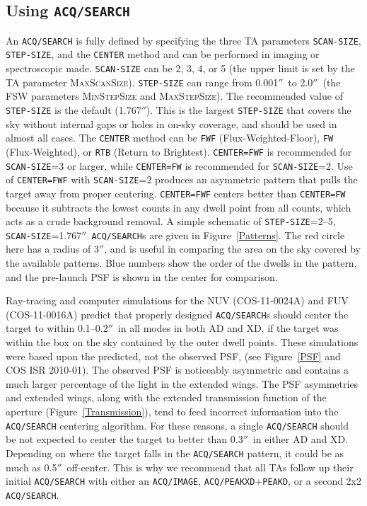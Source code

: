 \documentclass[12pt]{article}
\newcommand{\arcsec}{\ensuremath{''}}
\begin{document}
\subsection{Using \texttt{ACQ/SEARCH}}\label{sec:SEARCH}
An \texttt{ACQ/SEARCH} is fully defined by specifying the three TA parameters
\texttt{SCAN-SIZE}, \texttt{STEP-SIZE}, and the \texttt{CENTER} method and
can be performed in imaging or spectroscopic made.
\texttt{SCAN-SIZE} can be 2, 3, 4, or 5 (the upper limit is set by the
TA parameter \textsc{MaxScanSize}). \texttt{STEP-SIZE} can range from 0.001\arcsec\ to 2.0\arcsec\
(the FSW parameters \textsc{MinStepSize} and \textsc{MaxStepSize}).
The recommended value of \texttt{STEP-SIZE} is the default (1.767\arcsec).
This is the largest \texttt{STEP-SIZE} that covers the sky without internal gaps or holes in on-sky coverage,
and should be used in almost all cases. The \texttt{CENTER} method can be \texttt{FWF} (Flux-Weighted-Floor),
\texttt{FW} (Flux-Weighted), or \texttt{RTB} (Return to Brightest). \texttt{CENTER=FWF} is recommended for
\texttt{SCAN-SIZE}=3 or larger, while \texttt{CENTER=FW} is recommended for \texttt{SCAN-SIZE}=2.
Use of \texttt{CENTER=FWF} with \texttt{SCAN-SIZE}=2 produces an asymmetric pattern that pulls the
target away from proper centering.
\texttt{CENTER=FWF} centers better than \texttt{CENTER=FW} because it subtracts the lowest counts in any
dwell point from all counts, which acts as a crude background removal. A simple schematic of \texttt{STEP-SIZE}=2--5,
\texttt{SCAN-SIZE}=1.767\arcsec\ \texttt{ACQ/SEARCH}s are given in Figure~\ref{Patterns}. The {\color{red}red} circle here has a
radius of 3\arcsec, and is useful in comparing the area on the sky covered by the available patterns.
{\color{blue}Blue} numbers show the order of the dwells in the pattern, and the pre-launch PSF is shown in the center for comparison.

Ray-tracing and computer simulations for the NUV (COS-11-0024A) and
FUV (COS-11-0016A) predict that properly designed \texttt{ACQ/SEARCH}s should
center the target to within 0.1--0.2\arcsec\ in all modes in both AD and XD,
if the target was within the box on the sky contained by the outer dwell points.
These simulations were based upon the predicted, not the observed PSF, (see Figure~\ref{PSF} and COS ISR 2010-01).
The observed PSF is noticeably asymmetric and contains a much larger percentage
of the light in the extended wings. The PSF asymmetries
and extended wings, along with the extended transmission function of the aperture
(Figure~\ref{Transmission}), tend to feed incorrect information into the \texttt{ACQ/SEARCH} centering
algorithm.
For these reasons, a single \texttt{ACQ/SEARCH} should be not expected to center the target
to better than 0.3\arcsec\ in either AD and XD. Depending on where the target
falls in the \texttt{ACQ/SEARCH} pattern, it could be as much as 0.5\arcsec\ off-center. This is why we recommend that
all TAs follow up their initial \texttt{ACQ/SEARCH} with either an \texttt{ACQ/IMAGE}, \texttt{ACQ/PEAKXD}+\texttt{PEAKD}, or a second 2x2 \texttt{ACQ/SEARCH}.
\end{document}

